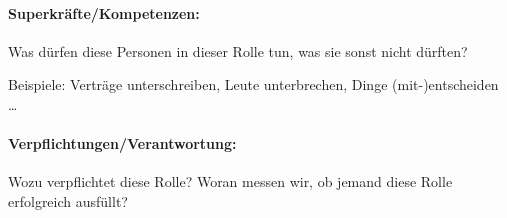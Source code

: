 \paragraph{Superkräfte/Kompetenzen:} Was dürfen diese Personen in dieser Rolle tun, was sie sonst nicht dürften?

Beispiele: Verträge unterschreiben, Leute unterbrechen, Dinge (mit-)entscheiden \ldots

\paragraph{Verpflichtungen/Verantwortung:} Wozu verpflichtet diese Rolle? Woran messen wir, ob jemand diese Rolle erfolgreich ausfüllt?
